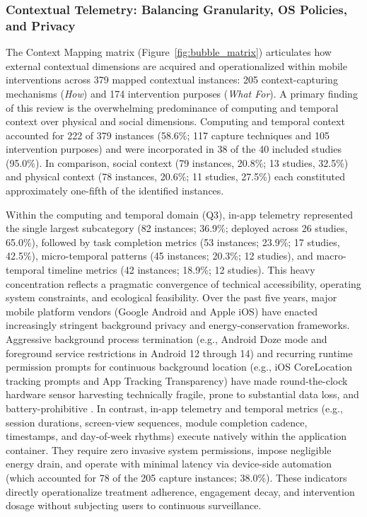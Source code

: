 \subsubsection{Contextual Telemetry: Balancing Granularity, OS Policies, and Privacy}

The Context Mapping matrix (Figure~\ref{fig:bubble_matrix}) articulates how external contextual dimensions are acquired and operationalized within mobile interventions across 379 mapped contextual instances: 205 context-capturing mechanisms (\textit{How}) and 174 intervention purposes (\textit{What For}). A primary finding of this review is the overwhelming predominance of computing and temporal context over physical and social dimensions. Computing and temporal context accounted for 222 of 379 instances (58.6\%; 117 capture techniques and 105 intervention purposes) and were incorporated in 38 of the 40 included studies (95.0\%). In comparison, social context (79 instances, 20.8\%; 13 studies, 32.5\%) and physical context (78 instances, 20.6\%; 11 studies, 27.5\%) each constituted approximately one-fifth of the identified instances.

Within the computing and temporal domain (Q3), in-app telemetry represented the single largest subcategory (82 instances; 36.9\%; deployed across 26 studies, 65.0\%), followed by task completion metrics (53 instances; 23.9\%; 17 studies, 42.5\%), micro-temporal patterns (45 instances; 20.3\%; 12 studies), and macro-temporal timeline metrics (42 instances; 18.9\%; 12 studies). This heavy concentration reflects a pragmatic convergence of technical accessibility, operating system constraints, and ecological feasibility. Over the past five years, major mobile platform vendors (Google Android and Apple iOS) have enacted increasingly stringent background privacy and energy-conservation frameworks. Aggressive background process termination (e.g., Android Doze mode and foreground service restrictions in Android 12 through 14) and recurring runtime permission prompts for continuous background location (e.g., iOS CoreLocation tracking prompts and App Tracking Transparency) have made round-the-clock hardware sensor harvesting technically fragile, prone to substantial data loss, and battery-prohibitive \cite{ometov2021, adler2024actionablesensing}. In contrast, in-app telemetry and temporal metrics (e.g., session durations, screen-view sequences, module completion cadence, timestamps, and day-of-week rhythms) execute natively within the application container. They require zero invasive system permissions, impose negligible energy drain, and operate with minimal latency via device-side automation (which accounted for 78 of the 205 capture instances; 38.0\%). These indicators directly operationalize treatment adherence, engagement decay, and intervention dosage without subjecting users to continuous surveillance.

